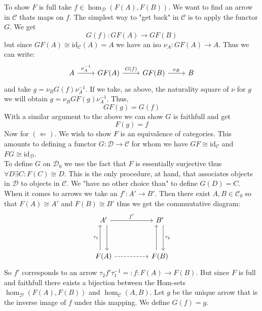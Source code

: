 \documentclass[11pt]{article}
\theoremstyle{plain}
\theoremstyle{definition}
\theoremstyle{remark}
\newcommand{\cC}{\mathcal{C}}
\newcommand{\cD}{\mathcal{D}}
\newcommand{\id}{\mathrm{id}}
\begin{document}
To show $F$ is full take $f \in \hom_{\cD}(F(A),F(B))$. We want to find an arrow in $\cC$ thats maps on $f$. The simplest way to "get back" in $\cC$ is to apply the functor $G$. We get \[G(f):GF(A) \to GF(B)\] but since $GF(A) \cong \id_{\cC}(A)=A$ we have an iso $\nu_A:GF(A) \to A$. Thus we can write: 
\[\begin{tikzcd}
	{A} & {GF(A)} & {GF(B)} & {B}
	\arrow["{\nu_A^{-1}}", from=1-1, to=1-2]
	\arrow["{G(f)}", from=1-2, to=1-3]
	\arrow["{\nu_B}", from=1-3, to=1-4]
\end{tikzcd}\] and take $g=\nu_B G(f) \nu_A^{-1}$. 
If we take, as above, the naturality square of $\nu$ for $g$ we will obtain $g=\nu_B GF(g)\nu_A^{-1}$.
 Thus, \[GF(g)=G(f)\] With a similar argument to the above we can show $G$ is faithfull and get \[F(g)=f\]
 Now for $(\Leftarrow)$. We wish to show $F$ is an equivalence of categories. This amounts to defining a functor $G:\cD \to \cC$ for whom we have $GF\cong \id_{\cC}$ and $FG \cong \id_{\cD}$.\\
  To define $G$ on $\cD_0$ we use the fact that $F$ is essentially surjective thus $\forall D \exists C: F(C) \cong D$. This is the only procedure, at hand, that associates objects in $\cD$ to objects in $\cC$. We "have no other choice than" to define $G(D)=C$.\\
  When it comes to arrows we take an $f':A' \to B'$. Then there exist $A,B \in \cC_0$ so that $F(A)\cong A'$ and $F(B)\cong B'$ thus we get the commuutative diagram: 
\[\begin{tikzcd}
	{A'} && {B'} \\
	\\
	{F(A)} && {F(B)}
	\arrow["{f'}", from=1-1, to=1-3]
	\arrow[from=1-1, to=3-1, shift left=2]
	\arrow[from=3-1, to=3-3, dashed]
	\arrow["{\tau_1}", from=3-1, to=1-1, shift left=2]
	\arrow[from=3-3, to=1-3, shift left=2]
	\arrow["{\tau_2}", from=1-3, to=3-3, shift left=2]
\end{tikzcd}\]
 So $f'$ corresponds to an arrow $\tau_2 f' \tau_1^{-1}=:f:F(A)\to F(B)$. But since $F$ is full and faithfull there exists a bijection between the Hom-sets $\hom_{\cD}(F(A),F(B))$ and $\hom_{\cC}(A,B)$. Let $g$ be the unique arrow that is the inverse image of $f$ under this mapping. We define $G(f)=g$.\\
\end{document}
